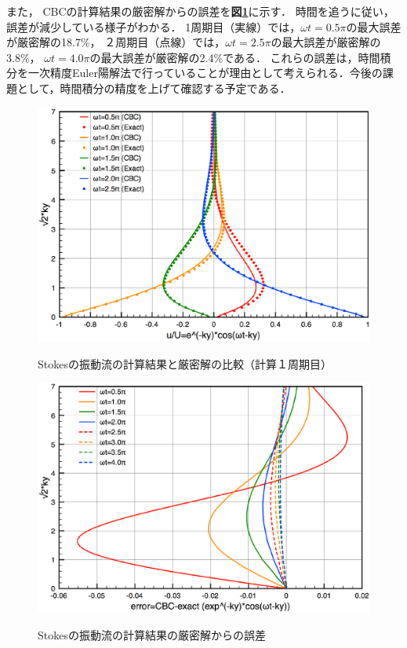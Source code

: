 また，
CBCの計算結果の厳密解からの誤差を\textbf{図\ref{fig:stokes_error}}に示す．
時間を追うに従い，誤差が減少している様子がわかる．
1周期目（実線）では，$\omega t=0.5\pi$の最大誤差が厳密解の18.7\%，
２周期目（点線）では，$\omega t=2.5\pi$の最大誤差が厳密解の3.8\%，
$\omega t=4.0\pi$の最大誤差が厳密解の2.4\%である．
これらの誤差は，時間積分を一次精度Euler陽解法で行っていることが理由として考えられる．今後の課題として，時間積分の精度を上げて確認する予定である．

\begin{figure}[htbp]
\begin{center}
\includegraphics[width=14cm]{13-1stokes.eps}
\caption{Stokesの振動流の計算結果と厳密解の比較（計算１周期目）}
\label{fig:stokes_hikaku1}
\includegraphics[width=14cm]{error1-2cycle.eps}
\caption{Stokesの振動流の計算結果の厳密解からの誤差}
\end{center}
\label{fig:stokes_error}
\end{figure}


